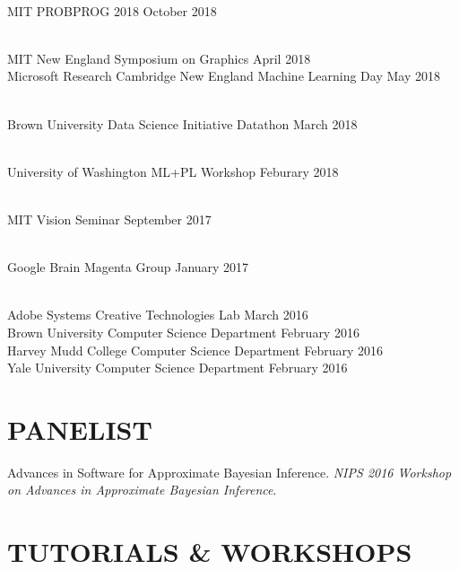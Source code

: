 \documentclass[line,margin]{res}
\begin{document}
\begin{resume}
\\
\talk
	{MIT}
	{PROBPROG 2018}
	{October 2018}

\\
\talk
	{MIT}
	{New England Symposium on Graphics}
	{April 2018}\\
\talk
	{Microsoft Research Cambridge}
	{New England Machine Learning Day}
	{May 2018}

\\
\talk
	{Brown University Data Science Initiative}
	{Datathon}
	{March 2018}

\\
\talk
	{University of Washington}
	{ML+PL Workshop}
	{Feburary 2018}

\\
\talk
	{MIT}
	{Vision Seminar}
	{September 2017}

\\
\talk
	{Google Brain}
	{Magenta Group}
	{January 2017}

\\
\talk
	{Adobe Systems}
	{Creative Technologies Lab}
	{March 2016}\\
\talk
	{Brown University}
	{Computer Science Department}
	{February 2016}\\
\talk
	{Harvey Mudd College}
	{Computer Science Department}
	{February 2016}\\
\talk
	{Yale University}
	{Computer Science Department}
	{February 2016}


\section{PANELIST}

\newcommand{\panelist}[2]{
	#1. \emph{#2}.
}

\panelist{Advances in Software for Approximate Bayesian Inference}{NIPS 2016 Workshop on Advances in Approximate Bayesian Inference}


\section{TUTORIALS \& WORKSHOPS}


\end{resume}
\end{document}
